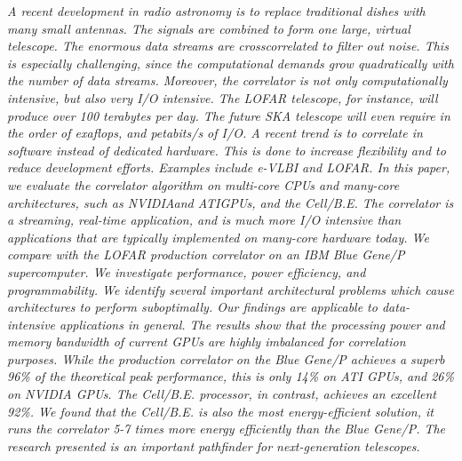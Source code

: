 \textit{A recent development in radio astronomy is to replace traditional
dishes with many small antennas. The signals are combined to form
one large, virtual telescope. The enormous data streams are crosscorrelated
to filter out noise. This is especially challenging, since
the computational demands grow quadratically with the number of
data streams. Moreover, the correlator is not only computationally
intensive, but also very I/O intensive. The LOFAR telescope, for
instance, will produce over 100 terabytes per day. The future SKA
telescope will even require in the order of exaflops, and petabits/s
of I/O. A recent trend is to correlate in software instead of dedicated
hardware. This is done to increase flexibility and to reduce
development efforts. Examples include e-VLBI and LOFAR.
In this paper, we evaluate the correlator algorithm on multi-core
CPUs and many-core architectures, such as NVIDIAand ATIGPUs,
and the Cell/B.E. The correlator is a streaming, real-time application,
and is much more I/O intensive than applications that are
typically implemented on many-core hardware today. We compare
with the LOFAR production correlator on an IBM Blue Gene/P supercomputer.
We investigate performance, power efficiency, and
programmability. We identify several important architectural problems
which cause architectures to perform suboptimally. Our findings
are applicable to data-intensive applications in general.
The results show that the processing power and memory bandwidth
of current GPUs are highly imbalanced for correlation purposes.
While the production correlator on the Blue Gene/P achieves a superb 96\% of the theoretical peak performance, this is only 14\%
on ATI GPUs, and 26\% on NVIDIA GPUs. The Cell/B.E. processor,
in contrast, achieves an excellent 92\%. We found that the
Cell/B.E. is also the most energy-efficient solution, it runs the correlator
5-7 times more energy efficiently than the Blue Gene/P. The
research presented is an important pathfinder for next-generation
telescopes.
}\\

